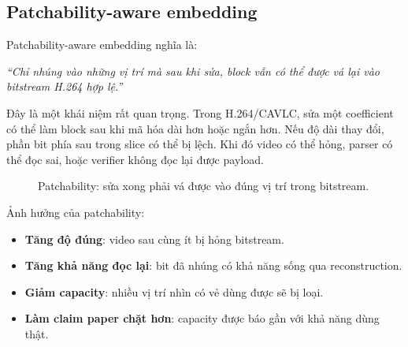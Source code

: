 \documentclass[11pt,a4paper]{article}
\begin{document}
\subsection{Patchability-aware embedding}

Patchability-aware embedding nghĩa là:

\begin{center}
\textit{``Chỉ nhúng vào những vị trí mà sau khi sửa, block vẫn có thể được vá
lại vào bitstream H.264 hợp lệ.''}
\end{center}

Đây là một khái niệm rất quan trọng. Trong H.264/CAVLC, sửa một coefficient có
thể làm block sau khi mã hóa dài hơn hoặc ngắn hơn. Nếu độ dài thay đổi, phần
bit phía sau trong slice có thể bị lệch. Khi đó video có thể hỏng, parser có
thể đọc sai, hoặc verifier không đọc lại được payload.

\begin{figure}[H]
\centering
{}
\caption{Patchability: sửa xong phải vá được vào đúng vị trí trong bitstream.}
\label{fig:patchability}
\end{figure}

Ảnh hưởng của patchability:

\begin{itemize}[leftmargin=*]
  \item \textbf{Tăng độ đúng}: video sau cùng ít bị hỏng bitstream.
  \item \textbf{Tăng khả năng đọc lại}: bit đã nhúng có khả năng sống qua reconstruction.
  \item \textbf{Giảm capacity}: nhiều vị trí nhìn có vẻ dùng được sẽ bị loại.
  \item \textbf{Làm claim paper chặt hơn}: capacity được báo gần với khả năng dùng thật.
\end{itemize}
\end{document}
